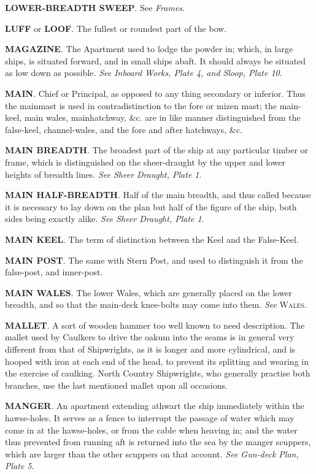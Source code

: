 \textbf{LOWER-BREADTH SWEEP}. See \textit{Frames}. 

\textbf{LUFF} or\textbf{ LOOF}. The fullest or roundest part of the bow. 

\textbf{MAGAZINE}. The Apartment used to lodge the powder in; which, in large ships, is situated forward, and in small ships abaft. It should always be situated as low down as possible. \textit{See Inboard Works, Plate 4, and Sloop, Plate 10}. 

\textbf{MAIN}. Chief or Principal, as opposed to any thing secondary or inferior. Thus the mainmast is used in contradistinction to the fore or mizen mast; the main-keel, main wales, mainhatchway, \&c. are in like manner distinguished from the false-keel, channel-wales, and the fore and after hatchways, \&c. 

\textbf{MAIN BREADTH}. The broadest part of the ship at any particular timber or frame, which is distinguished on the sheer-draught by the upper and lower heights of breadth lines. \textit{See Sheer Draught, Plate 1}. 

\textbf{MAIN HALF-BREADTH}. Half of the main breadth, and thus called because it is necessary to lay down on the plan but half of the figure of the ship, both sides being exactly alike. \textit{See Sheer Draught, Plate 1}. 

\textbf{MAIN KEEL}. The term of distinction between the Keel and the False-Keel.

\textbf{MAIN POST}. The same with Stern Post, and used to distinguish it from the false-post, and inner-post. 

\textbf{MAIN WALES}. The lower Wales, which are generally placed on the lower breadth, and so that the main-deck knee-bolts may come into them. \textit{See} \textsc{Wales}. 

\textbf{MALLET}. A sort of wooden hammer too well known to need description. The mallet used by Caulkers to drive the oakum into the seams is in general very different from that of Shipwrights, as it is longer and more cylindrical, and is hooped with iron at each end of the head, to prevent its splitting and wearing in the exercise of caulking. North Country Shipwrights, who generally practise both branches, use the last mentioned mallet upon all occasions. 

\textbf{MANGER}. An apartment extending athwart the ship immediately within the hawse-holes. It serves as a fence to interrupt the passage of water which may come in at the hawse-holes, or from the cable when heaving in; and the water thus prevented from running aft is returned into the sea by the manger scuppers, which are larger than the other scuppers on that account. \textit{See Gun-deck Plan, Plate 5}. 

